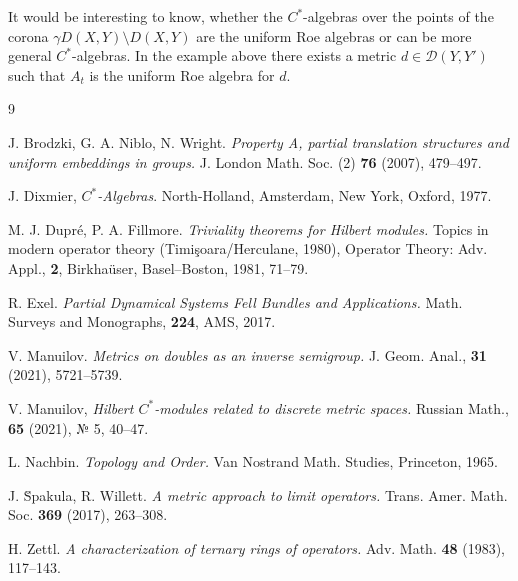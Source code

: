 \documentclass[12pt]{amsart}
\theoremstyle{definition}
\begin{document}
It would be interesting to know, whether the $C^*$-algebras over the points of the corona $\gamma D(X,Y)\setminus D(X,Y)$ are the uniform Roe algebras or can be more general $C^*$-algebras. In the example above there exists a metric $d\in\mathcal D(Y,Y')$ such that $A_t$ is the uniform Roe algebra for $d$.

\begin{thebibliography}{9}

J. Brodzki, G. A. Niblo, N. Wright. \emph{Property A, partial translation structures and uniform embeddings in groups.} J. London Math. Soc. (2) {\bf 76} (2007), 479--497.

J. Dixmier, \emph{$C^*$-Algebras}. North-Holland, Amsterdam, New York, Oxford, 1977.

M. J. Dupr\'e, P. A. Fillmore. \emph{Triviality theorems for Hilbert modules.} Topics in modern operator theory (Timi\c soara/Herculane, 1980),
Operator Theory: Adv. Appl., {\bf 2}, Birkha\"user, Basel--Boston, 1981, 71--79.

R. Exel. \emph{Partial Dynamical Systems Fell Bundles and Applications.} Math. Surveys and Monographs, {\bf 224}, AMS, 2017.

 V. Manuilov. \emph{Metrics on doubles as an inverse semigroup.}
J. Geom. Anal., {\bf 31} (2021), 5721--5739.

 V. Manuilov, \emph{Hilbert $C^*$-modules related to discrete metric spaces.}
Russian Math., {\bf 65} (2021), № 5, 40--47. 

L. Nachbin. \emph{Topology and Order.} Van Nostrand Math. Studies, Princeton, 1965.

J. \u Spakula, R. Willett. 
\emph{A metric approach to limit operators.} Trans. Amer. Math. Soc. {\bf 369} (2017), 263--308.

 H. Zettl. \emph{A characterization of ternary rings of operators.} Adv. Math. {\bf 48} (1983), 117--143.


\end{thebibliography}
\end{document}
